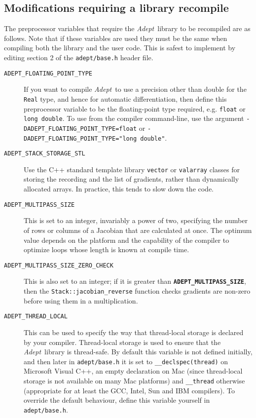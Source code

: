 \documentclass[a4,oneside]{book}
\def\codesize{\small}
\def\Adept{\emph{Adept}}
\def\code#1{{\codesize\texttt{#1}}}
\def\codebf#1{{\codesize\texttt{\textbf{#1}}}}
\def\citem#1{\item[{\codesize\texttt{#1}}]}
\begin{document}
\subsection{Modifications requiring a library recompile}
\label{sec:configuring_lib}
\noindent The preprocessor variables that require the \Adept\ library
to be recompiled are as follows. Note that if these variables are used
they must be the same when compiling both the library and the user
code. This is safest to implement by editing section 2 of the
\code{adept/base.h} header file.
\begin{description}
\citem{ADEPT\_FLOATING\_POINT\_TYPE} If you want to compile \Adept\ to
use a precision other than double for the \code{Real} type, and hence
for automatic differentiation, then define this preprocessor variable
to be the floating-point type required, e.g. \code{float} or
\code{long double}. To use from the compiler command-line, use the
argument \code{-DADEPT\_FLOATING\_POINT\_TYPE=float} or
\code{-DADEPT\_FLOATING\_POINT\_TYPE="long double"}.
%
\citem{ADEPT\_STACK\_STORAGE\_STL} Use the C++ standard template
library \code{vector} or \code{valarray} classes for storing the
recording and the list of gradients, rather than dynamically allocated
arrays. In practice, this tends to slow down the code.
%
\citem{ADEPT\_MULTIPASS\_SIZE} This is set to an integer, invariably a
power of two, specifying the number of rows or columns of a Jacobian
that are calculated at once. The optimum value depends on the platform
and the capability of the compiler to optimize loops whose length is
known at compile time.
% 
\citem{ADEPT\_MULTIPASS\_SIZE\_ZERO\_CHECK} This is also set to an
integer; if it is greater than \codebf{ADEPT\_MULTIPASS\_SIZE}, then
the \code{Stack::jacobian\_reverse} function checks gradients are
non-zero before using them in a multiplication.
%
\citem{ADEPT\_THREAD\_LOCAL} This can be used to specify the way that
thread-local storage is declared by your compiler.  Thread-local
storage is used to ensure that the \Adept\ library is thread-safe. By
default this variable is not defined initially, and then later in
\code{adept/base.h} it is set to \code{\_\_declspec(thread)} on
Microsoft Visual C++, an empty declaration on Mac (since thread-local
storage is not available on many Mac platforms) and \code{\_\_thread}
otherwise (appropriate for at least the GCC, Intel, Sun and IBM
compilers). To override the default behaviour, define this variable
yourself in \code{adept/base.h}.
\end{description}
\end{document}

